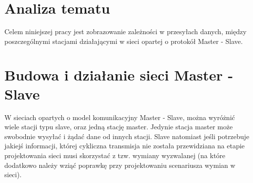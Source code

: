 \section{Analiza tematu}
Celem niniejszej pracy jest zobrazowanie zależności w przesyłach danych, między poszczególnymi stacjami działającymi w sieci opartej o protokół Master - Slave.

\section{Budowa i działanie sieci Master - Slave}
W sieciach opartych o model komunikacyjny Master - Slave, można wyróżnić wiele stacji typu slave, oraz jedną stację master. Jedynie stacja master może swobodnie wysyłać i żądać dane od innych stacji. Slave natomiast jeśli potrzebuje jakiejś informacji, której cykliczna transmisja nie została przewidziana na etapie projektowania sieci musi skorzystać z tzw. wymiany wyzwalanej (na które dodatkowo należy wziąć poprawkę przy projektowaniu scenariusza wymian w sieci).

